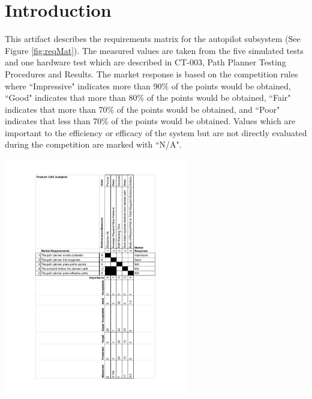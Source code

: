 \documentclass[]{auvsi_doc}
\begin{document}
\begin{AUVSITitlePage}
\begin{artifacttable}
\end{artifacttable}
\end{AUVSITitlePage}

\section{Introduction}
This artifact describes the requirements matrix for the autopilot subsystem (See Figure \ref{fig:reqMat}). The measured values are taken from the five simulated tests and one hardware test which are described in CT-003, Path Planner Testing Procedures and Results. The market response is based on the competition rules where ``Impressive" indicates more than 90\% of the points would be obtained, ``Good" indicates that more than 80\% of the points would be obtained, ``Fair" indicates that more than 70\% of the points would be obtained, and ``Poor" indicates that less than 70\% of the points would be obtained. Values which are important to the efficiency or efficacy of the system but are not directly evaluated during the competition are marked with ``N/A".

	\begin{center}
	\includegraphics[width=0.6\textwidth]{./figs/RequirementsMatrix.pdf}
	\vspace{2cm}
	\label{fig:reqMat}
	\end{center}

\end{document}
